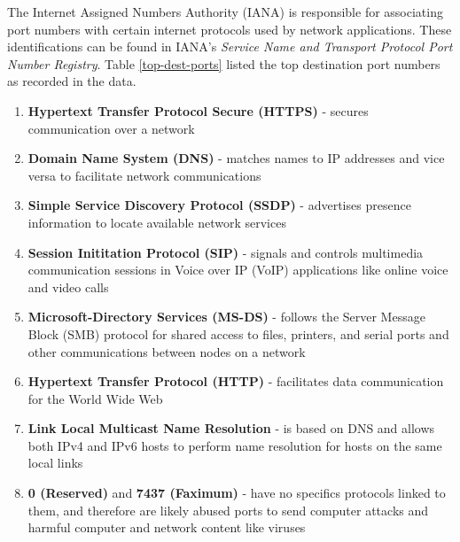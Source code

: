 \documentclass[journal]{IEEE/IEEEtran}
\begin{document}


The Internet Assigned Numbers Authority (IANA) is responsible for associating port numbers with certain internet protocols used by network applications. These identifications can be found in IANA's \textit{Service Name and Transport Protocol Port Number Registry}. Table \ref{top-dest-ports} listed the top destination port numbers as recorded in the data.


\begin{enumerate}

\item \textbf{Hypertext Transfer Protocol Secure (HTTPS)} - secures communication over a network

\item \textbf{Domain Name System (DNS)} - matches names to IP addresses and vice versa to facilitate network communications

\item \textbf{Simple Service Discovery Protocol (SSDP)} - advertises presence information to locate available network services

\item \textbf{Session Inititation Protocol (SIP)} - signals and controls multimedia communication sessions in Voice over IP (VoIP) applications like online voice and video calls

\item \textbf{Microsoft-Directory Services (MS-DS)} - follows the Server Message Block (SMB) protocol for shared access to files, printers, and serial ports and other communications between nodes on a network

\item \textbf{Hypertext Transfer Protocol (HTTP)} - facilitates data communication for the World Wide Web

\item \textbf{Link Local Multicast Name Resolution} - is based on DNS and allows both IPv4 and IPv6 hosts to perform name resolution for hosts on the same local links

\item \textbf{0 (Reserved)} and \textbf{7437 (Faximum)} - have no specifics protocols linked to them, and therefore are likely abused ports to send computer attacks and harmful computer and network content like viruses


\end{enumerate}
\end{document}
